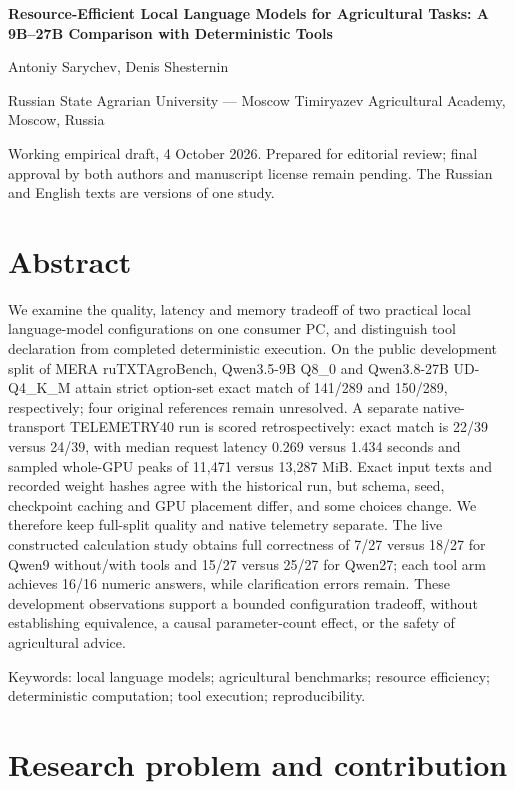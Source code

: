 \documentclass[10pt,a4paper]{article}
\begin{document}
\begin{center}\bfseries Resource-Efficient Local Language Models for Agricultural Tasks: A 9B--27B Comparison with Deterministic Tools\end{center}

Antoniy Sarychev, Denis Shesternin


Russian State Agrarian University --- Moscow Timiryazev Agricultural Academy, Moscow, Russia


Working empirical draft, 4 October 2026. Prepared for editorial review; final approval by both authors and manuscript license remain pending. The Russian and English texts are versions of one study.


\section*{Abstract}

We examine the quality, latency and memory tradeoff of two practical local language-model configurations on one consumer PC, and distinguish tool declaration from completed deterministic execution. On the public development split of MERA ruTXTAgroBench, Qwen3.5-9B Q8\_0 and Qwen3.8-27B UD-Q4\_K\_M attain strict option-set exact match of 141/289 and 150/289, respectively; four original references remain unresolved. A separate native-transport TELEMETRY40 run is scored retrospectively: exact match is 22/39 versus 24/39, with median request latency 0.269 versus 1.434 seconds and sampled whole-GPU peaks of 11,471 versus 13,287 MiB. Exact input texts and recorded weight hashes agree with the historical run, but schema, seed, checkpoint caching and GPU placement differ, and some choices change. We therefore keep full-split quality and native telemetry separate. The live constructed calculation study obtains full correctness of 7/27 versus 18/27 for Qwen9 without/with tools and 15/27 versus 25/27 for Qwen27; each tool arm achieves 16/16 numeric answers, while clarification errors remain. These development observations support a bounded configuration tradeoff, without establishing equivalence, a causal parameter-count effect, or the safety of agricultural advice.


Keywords: local language models; agricultural benchmarks; resource efficiency; deterministic computation; tool execution; reproducibility.


\section{Research problem and contribution}
\end{document}
